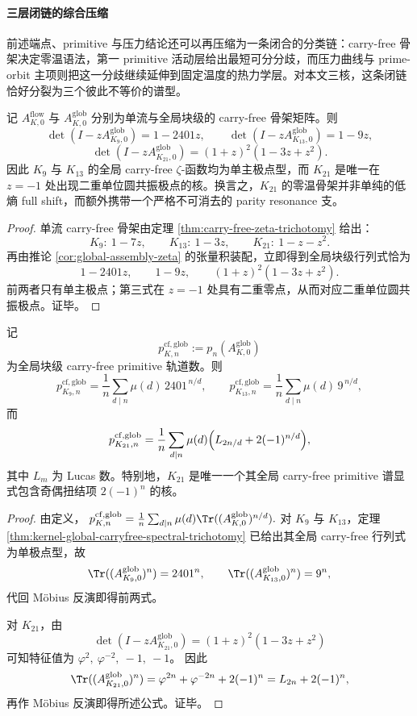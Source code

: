 \paragraph{三层闭链的综合压缩}
前述端点、primitive 与压力结论还可以再压缩为一条闭合的分类链：carry-free 骨架决定零温语法，第一 primitive 活动层给出最短可分分歧，而压力曲线与 prime-orbit 主项则把这一分歧继续延伸到固定温度的热力学层。对本文三核，这条闭链恰好分裂为三个彼此不等价的谱型。

\begin{theorem}\label{thm:kernel-global-carryfree-spectral-trichotomy}
记 \(A_{K,0}^{\mathrm{flow}}\) 与 \(A_{K,0}^{\mathrm{glob}}\) 分别为单流与全局块级的 carry-free 骨架矩阵。则
\[
\det(I-zA_{K_9,0}^{\mathrm{glob}})=1-2401z,\qquad
\det(I-zA_{K_{13},0}^{\mathrm{glob}})=1-9z,
\]
\[
\det(I-zA_{K_{21},0}^{\mathrm{glob}})=(1+z)^2(1-3z+z^2).
\]
因此 \(K_9\) 与 \(K_{13}\) 的全局 carry-free \(\zeta\)-函数均为单主极点型，而 \(K_{21}\) 是唯一在 \(z=-1\) 处出现二重单位圆共振极点的核。换言之，\(K_{21}\) 的零温骨架并非单纯的低熵 full shift，而额外携带一个严格不可消去的 parity resonance 支。
\end{theorem}
\begin{proof}
单流 carry-free 骨架由定理 \ref{thm:carry-free-zeta-trichotomy} 给出：
\[
K_9:\ 1-7z,\qquad K_{13}:\ 1-3z,\qquad K_{21}:\ 1-z-z^2.
\]
再由推论 \ref{cor:global-assembly-zeta} 的张量积装配，立即得到全局块级行列式恰为
\[
1-2401z,\qquad 1-9z,\qquad (1+z)^2(1-3z+z^2).
\]
前两者只有单主极点；第三式在 \(z=-1\) 处具有二重零点，从而对应二重单位圆共振极点。证毕。
\end{proof}

\begin{theorem}\label{thm:kernel-global-carryfree-primitive-parity}
记
\[
p_{K,n}^{\mathrm{cf,glob}}:=p_n(A_{K,0}^{\mathrm{glob}})
\]
为全局块级 carry-free primitive 轨道数。则
\[
p_{K_9,n}^{\mathrm{cf,glob}}
=\frac{1}{n}\sum_{d\mid n}\mu(d)\,2401^{\,n/d},
\qquad
p_{K_{13},n}^{\mathrm{cf,glob}}
=\frac{1}{n}\sum_{d\mid n}\mu(d)\,9^{\,n/d},
\]
而
\[
p_{K_{21},n}^{\mathrm{cf,glob}}
=\frac{1}{n}\sum_{d\mid n}\mu(d)\Bigl(L_{2n/d}+2(-1)^{n/d}\Bigr),
\]
其中 \(L_m\) 为 Lucas 数。特别地，\(K_{21}\) 是唯一一个其全局 carry-free primitive 谱显式包含奇偶扭结项 \(2(-1)^n\) 的核。
\end{theorem}
\begin{proof}
由定义，
\(
p_{K,n}^{\mathrm{cf,glob}}=\frac{1}{n}\sum_{d\mid n}\mu(d)\Tr((A_{K,0}^{\mathrm{glob}})^{n/d}).
\)
对 \(K_9\) 与 \(K_{13}\)，定理 \ref{thm:kernel-global-carryfree-spectral-trichotomy} 已给出其全局 carry-free 行列式为单极点型，故
\[
\Tr((A_{K_9,0}^{\mathrm{glob}})^n)=2401^n,\qquad
\Tr((A_{K_{13},0}^{\mathrm{glob}})^n)=9^n,
\]
代回 Möbius 反演即得前两式。

对 \(K_{21}\)，由
\[
\det(I-zA_{K_{21},0}^{\mathrm{glob}})=(1+z)^2(1-3z+z^2)
\]
可知特征值为
\(
\varphi^2,\ \varphi^{-2},\ -1,\ -1
\)。
因此
\[
\Tr((A_{K_{21},0}^{\mathrm{glob}})^n)
=\varphi^{2n}+\varphi^{-2n}+2(-1)^n
=L_{2n}+2(-1)^n,
\]
再作 Möbius 反演即得所述公式。证毕。
\end{proof}


